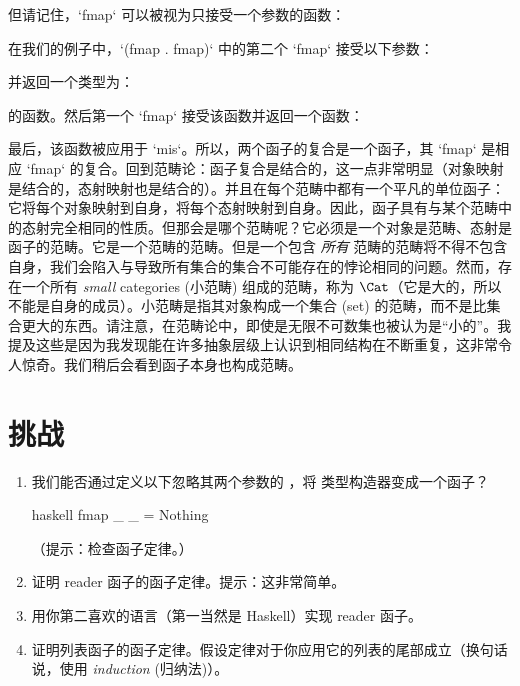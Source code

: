 但请记住，`fmap` 可以被视为只接受一个参数的函数：

在我们的例子中，`(fmap . fmap)` 中的第二个 `fmap` 接受以下参数：

并返回一个类型为：

的函数。然后第一个 `fmap` 接受该函数并返回一个函数：

最后，该函数被应用于 `mis`。所以，两个函子的复合是一个函子，其 `fmap` 是相应 `fmap` 的复合。回到范畴论：函子复合是结合的，这一点非常明显（对象映射是结合的，态射映射也是结合的）。并且在每个范畴中都有一个平凡的单位函子：它将每个对象映射到自身，将每个态射映射到自身。因此，函子具有与某个范畴中的态射完全相同的性质。但那会是哪个范畴呢？它必须是一个对象是范畴、态射是函子的范畴。它是一个范畴的范畴。但是一个包含 \emph{所有} 范畴的范畴将不得不包含自身，我们会陷入与导致所有集合的集合不可能存在的悖论相同的问题。然而，存在一个所有 \emph{small} categories (小范畴) 组成的范畴，称为 $\Cat$（它是大的，所以不能是自身的成员）。小范畴是指其对象构成一个集合 (set) 的范畴，而不是比集合更大的东西。请注意，在范畴论中，即使是无限不可数集也被认为是“小的”。我提及这些是因为我发现能在许多抽象层级上认识到相同结构在不断重复，这非常令人惊奇。我们稍后会看到函子本身也构成范畴。

\section{挑战}

\begin{enumerate}
  \tightlist
  \item
        我们能否通过定义以下忽略其两个参数的 ，将  类型构造器变成一个函子？

        \begin{snip}{haskell}
fmap _ _ = Nothing
\end{snip}

        （提示：检查函子定律。）
  \item
        证明 reader 函子的函子定律。提示：这非常简单。
  \item
        用你第二喜欢的语言（第一当然是 Haskell）实现 reader 函子。
  \item
        证明列表函子的函子定律。假设定律对于你应用它的列表的尾部成立（换句话说，使用 \emph{induction} (归纳法)）。
\end{enumerate}